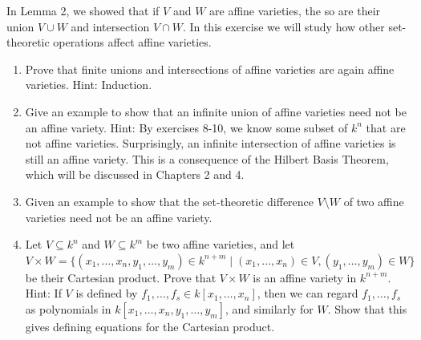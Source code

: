 \begin{exercise}{15}
In Lemma 2, we showed that if $V$ and $W$ are affine varieties, the so are their union $V\cup W$ and intersection $V\cap W$. In this exercise we will study how other set-theoretic operations affect affine varieties.
\begin{enumerate}
    \item Prove that finite unions and intersections of affine varieties are again affine varieties. Hint: Induction.
    \item Give an example to show that an infinite union of affine varieties need not be an affine variety. Hint: By exercises 8-10, we know some subset of $k^n$ that are not affine varieties. Surprisingly, an infinite intersection of affine varieties is still an affine variety. This is a consequence of the Hilbert Basis Theorem, which will be discussed in Chapters 2 and 4.
    \item Given an example to show that the set-theoretic difference $V\setminus W$ of two affine varieties need not be an affine variety.
    \item Let $V\subseteq k^n$ and $W\subseteq k^m$ be two affine varieties, and let $V\times W=\{(x_1,\dots,x_n,y_1,\dots,y_m)\in k^{n+m}\mid(x_1,\dots,x_n)\in V,(y_1,\dots,y_m)\in W\}$ be their Cartesian product. Prove that $V\times W$ is an affine variety in $k^{n+m}$. Hint: If $V$ is defined by $f_1,\dots,f_s\in k[x_1,\dots,x_n]$, then we can regard $f_1,\dots,f_s$ as polynomials in $k[x_1,\dots,x_n,y_1,\dots,y_m]$, and similarly for $W$. Show that this gives defining equations for the Cartesian product.
\end{enumerate}
\end{exercise}
